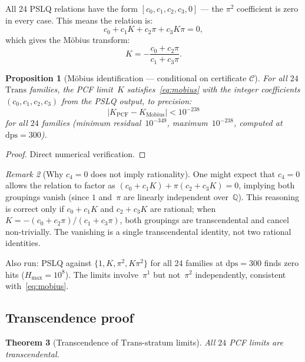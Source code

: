 \documentclass[12pt, reqno]{amsart}
\newtheorem{theorem}{Theorem}[section]
\newtheorem{proposition}[theorem]{Proposition}
\theoremstyle{definition}
\theoremstyle{remark}
\newtheorem{remark}[theorem]{Remark}
\newcommand{\Trans}{\mathrm{Trans}}
\begin{document}
All 24 PSLQ relations have the form $[c_0, c_1, c_2, c_3, 0]$ --- the $\pi^2$ coefficient
is zero in every case. This means the relation is:
\[
  c_0 + c_1 K + c_2\pi + c_3 K\pi = 0,
\]
which gives the M\"obius transform:
\begin{equation}\label{eq:mobius}
  K = -\frac{c_0 + c_2\pi}{c_1 + c_3\pi}.
\end{equation}

\begin{proposition}[M\"obius identification --- conditional on certificate $\mathcal{C}$]\label{prop:mobius}
For all $24$ $\Trans$ families,
the PCF limit~$K$ satisfies~\eqref{eq:mobius} with the integer coefficients $(c_0, c_1, c_2, c_3)$
from the PSLQ output, to precision:
\[
  |K_{\mathrm{PCF}} - K_{\mathrm{M\ddot{o}bius}}| < 10^{-238}
\]
for all $24$ families (minimum residual~$10^{-349}$, maximum~$10^{-238}$, computed at $\mathrm{dps}=300$).
\end{proposition}

\begin{proof}
Direct numerical verification.
\end{proof}

\begin{remark}[Why $c_4 = 0$ does not imply rationality]\label{rem:c4zero}
One might expect that
$c_4 = 0$ allows the relation to factor as $(c_0 + c_1 K) + \pi(c_2 + c_3 K) = 0$,
implying both groupings vanish (since $1$ and~$\pi$ are linearly independent over~$\mathbb{Q}$).
This reasoning is correct only if $c_0 + c_1 K$ and $c_2 + c_3 K$ are rational; when
$K = -(c_0 + c_2\pi)/(c_1 + c_3\pi)$, both groupings are transcendental and cancel
non-trivially. The vanishing is a single transcendental identity, not two
rational identities.

Also run: PSLQ against $\{1, K, \pi^2, K\pi^2\}$ for all 24 families at $\mathrm{dps}=300$
finds zero hits ($H_{\max}=10^8$). The limits involve~$\pi^1$ but not~$\pi^2$ independently,
consistent with~\eqref{eq:mobius}.
\end{remark}

\subsection{Transcendence proof}\label{ssec:transcendence}

\begin{theorem}[Transcendence of $\Trans$-stratum limits]\label{thm:trans}
All $24$ PCF limits
are transcendental.
\end{theorem}
\end{document}

